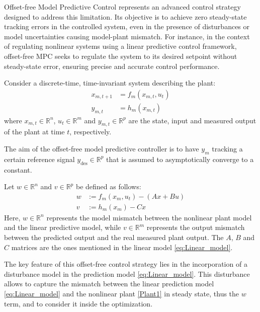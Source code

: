 \documentclass[a4paper,12pt,oneside]{book}
\begin{document}
\bigskip
Offset-free Model Predictive Control represents an advanced control strategy designed to address this limitation. 
Its objective is to achieve zero steady-state tracking errors in the controlled system, even in the presence of disturbances or model uncertainties causing model-plant mismatch.
For instance, in the context of regulating nonlinear systems using a linear predictive control framework, offset-free MPC seeks to regulate the system to its desired setpoint without steady-state error, ensuring precise and accurate control performance.

\bigskip
Consider a discrete-time, time-invariant system describing the plant:
\begin{equation}
\begin{aligned}
    x_{m,t+1} &= f_m (x_{m,t}, u_t) \\
    y_{m,t} &= h_m (x_{m,t}) 
\end{aligned}
\label{Plant1}
\end{equation}
where $x_{m,t} \in \mathbb{R}^n$, $u_t \in \mathbb{R}^m$ and $y_{m,t} \in \mathbb{R}^p$ are the state, input and measured output of the plant at time $t$, respectively.

The aim of the offset-free model predictive controller is to have $y_m$ tracking a certain reference signal $y_{\text{des}} \in \mathbb{R}^p$ that is assumed to asymptotically converge to a constant.

\bigskip
Let $w \in \mathbb{R}^n$ and $v \in \mathbb{R}^p$ be defined as follows:
\begin{equation}
\begin{aligned}
    w & := f_m (x_m, u_t) - (A x + Bu) \\
    v & := h_m (x_m) - C x
\end{aligned}
\label{Plant_model_mismatch}
\end{equation}
Here, $w \in \mathbb{R}^n$ represents the model mismatch between the nonlinear plant model and the linear predictive model, while $v \in \mathbb{R}^m$ represents the output mismatch between the predicted output and the real measured plant output.
The $A$, $B$ and $C$ matrices are the ones mentioned in the linear model \eqref{eq:Linear_model}.

\bigskip
The key feature of this offset-free control strategy lies in the incorporation of a disturbance model in the prediction model \eqref{eq:Linear_model}.
This disturbance allows to capture the mismatch between the linear prediction model \eqref{eq:Linear_model} and the nonlinear plant \eqref{Plant1} in steady state, thus the $w$ term, and to consider it inside the optimization.
\end{document}
